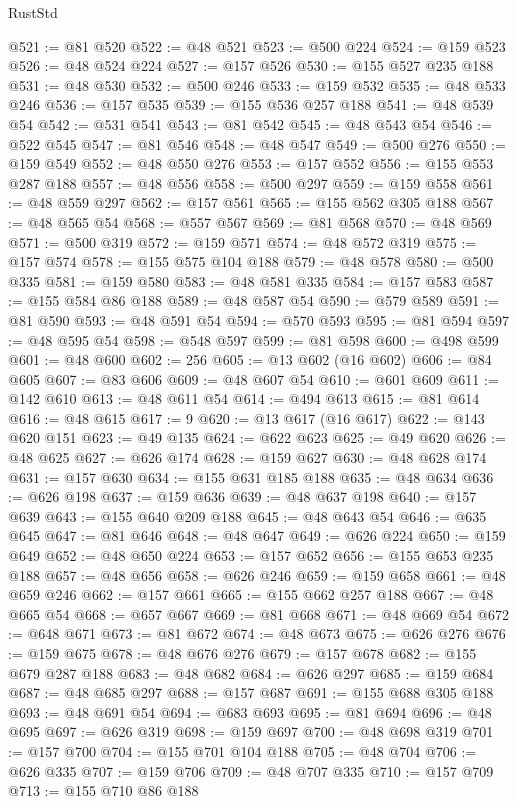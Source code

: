 \begin{lexlean}{RustStd}
\begin{coremodule}
@521 := @81 @520
@522 := @48 @521
@523 := @500 @224
@524 := @159 @523
@526 := @48 @524 @224
@527 := @157 @526
@530 := @155 @527 @235 @188
@531 := @48 @530
@532 := @500 @246
@533 := @159 @532
@535 := @48 @533 @246
@536 := @157 @535
@539 := @155 @536 @257 @188
@541 := @48 @539 @54
@542 := @531 @541
@543 := @81 @542
@545 := @48 @543 @54
@546 := @522 @545
@547 := @81 @546
@548 := @48 @547
@549 := @500 @276
@550 := @159 @549
@552 := @48 @550 @276
@553 := @157 @552
@556 := @155 @553 @287 @188
@557 := @48 @556
@558 := @500 @297
@559 := @159 @558
@561 := @48 @559 @297
@562 := @157 @561
@565 := @155 @562 @305 @188
@567 := @48 @565 @54
@568 := @557 @567
@569 := @81 @568
@570 := @48 @569
@571 := @500 @319
@572 := @159 @571
@574 := @48 @572 @319
@575 := @157 @574
@578 := @155 @575 @104 @188
@579 := @48 @578
@580 := @500 @335
@581 := @159 @580
@583 := @48 @581 @335
@584 := @157 @583
@587 := @155 @584 @86 @188
@589 := @48 @587 @54
@590 := @579 @589
@591 := @81 @590
@593 := @48 @591 @54
@594 := @570 @593
@595 := @81 @594
@597 := @48 @595 @54
@598 := @548 @597
@599 := @81 @598
@600 := @498 @599
@601 := @48 @600
@602 := 256
@605 := @13 @602 (@16 @602)
@606 := @84 @605
@607 := @83 @606
@609 := @48 @607 @54
@610 := @601 @609
@611 := @142 @610
@613 := @48 @611 @54
@614 := @494 @613
@615 := @81 @614
@616 := @48 @615
@617 := 9
@620 := @13 @617 (@16 @617)
@622 := @143 @620 @151
@623 := @49 @135
@624 := @622 @623
@625 := @49 @620
@626 := @48 @625
@627 := @626 @174
@628 := @159 @627
@630 := @48 @628 @174
@631 := @157 @630
@634 := @155 @631 @185 @188
@635 := @48 @634
@636 := @626 @198
@637 := @159 @636
@639 := @48 @637 @198
@640 := @157 @639
@643 := @155 @640 @209 @188
@645 := @48 @643 @54
@646 := @635 @645
@647 := @81 @646
@648 := @48 @647
@649 := @626 @224
@650 := @159 @649
@652 := @48 @650 @224
@653 := @157 @652
@656 := @155 @653 @235 @188
@657 := @48 @656
@658 := @626 @246
@659 := @159 @658
@661 := @48 @659 @246
@662 := @157 @661
@665 := @155 @662 @257 @188
@667 := @48 @665 @54
@668 := @657 @667
@669 := @81 @668
@671 := @48 @669 @54
@672 := @648 @671
@673 := @81 @672
@674 := @48 @673
@675 := @626 @276
@676 := @159 @675
@678 := @48 @676 @276
@679 := @157 @678
@682 := @155 @679 @287 @188
@683 := @48 @682
@684 := @626 @297
@685 := @159 @684
@687 := @48 @685 @297
@688 := @157 @687
@691 := @155 @688 @305 @188
@693 := @48 @691 @54
@694 := @683 @693
@695 := @81 @694
@696 := @48 @695
@697 := @626 @319
@698 := @159 @697
@700 := @48 @698 @319
@701 := @157 @700
@704 := @155 @701 @104 @188
@705 := @48 @704
@706 := @626 @335
@707 := @159 @706
@709 := @48 @707 @335
@710 := @157 @709
@713 := @155 @710 @86 @188

\end{coremodule}
\end{lexlean}

